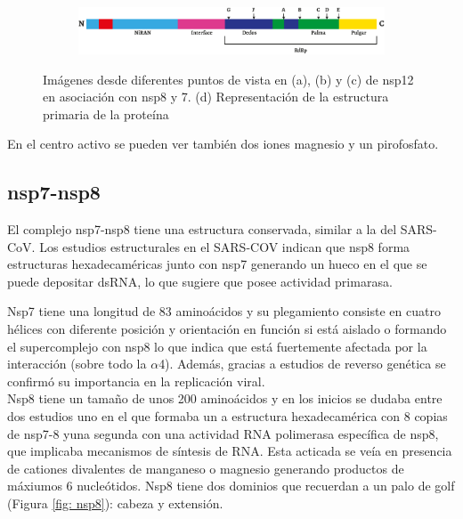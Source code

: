 \documentclass[a4paper,11pt]{report}
\begin{document}
\begin{figure}[h!]
\begin{subfigure}[h]{\textwidth}
	\includegraphics[width=\linewidth]{Figuras/Figura7}
	\caption{}
	\label{1º}	
\end{subfigure}



 \label{nsp12}
 \caption{Imágenes desde diferentes puntos de vista en (a), (b) y (c) de nsp12 en asociación con nsp8 y 7. (d) Representación de la estructura primaria de la proteína}
 \end{figure}

En el centro activo se pueden ver también dos iones magnesio y un pirofosfato. 
\subsection{nsp7-nsp8}
El complejo nsp7-nsp8 tiene una estructura conservada, similar a la del SARS-CoV. Los estudios estructurales en el SARS-COV indican que nsp8 forma estructuras hexadecaméricas junto con nsp7 generando un hueco en el que se puede depositar dsRNA, lo que sugiere que posee actividad primarasa. \cite{78}

Nsp7 tiene una longitud de 83 aminoácidos y su plegamiento consiste en cuatro hélices con diferente posición y orientación en función si está aislado o formando el supercomplejo con nsp8 lo que indica que está fuertemente afectada por la interacción (sobre todo la $\alpha$4). Además, gracias a estudios de reverso genética se confirmó su importancia en la replicación viral. \\

Nsp8 tiene un tamaño de unos 200 aminoácidos y en los inicios se dudaba entre dos estudios uno en el que formaba un a estructura hexadecamérica con 8 copias de nsp7-8 yuna segunda con una actividad RNA polimerasa específica de nsp8, que implicaba mecanismos de síntesis de RNA. Esta acticada se veía en presencia de cationes divalentes de manganeso o magnesio generando productos de máxiumos 6 nucleótidos. Nsp8 tiene dos dominios que recuerdan a un palo de golf (Figura \ref{fig: nsp8}): cabeza y extensión. \\
\end{document}
